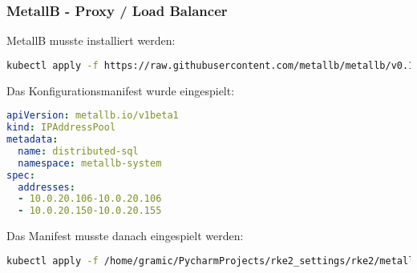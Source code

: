 \subsubsection{MetallB - Proxy / Load Balancer}
MetallB musste installiert werden:
\lstset{style=gra_codestyle}
\begin{lstlisting}[language=bash, caption=MetallB installieren,captionpos=b,label={lst:metallb-install},breaklines=true]
kubectl apply -f https://raw.githubusercontent.com/metallb/metallb/v0.14.4/config/manifests/metallb-native.yaml
\end{lstlisting}

Das Konfigurationsmanifest wurde eingespielt:
\lstset{style=gra_codestyle}
\begin{lstlisting}[language=yaml, caption=MetallB konfigurieren,captionpos=b,label={lst:metallb-config},breaklines=true]
apiVersion: metallb.io/v1beta1
kind: IPAddressPool
metadata:
  name: distributed-sql
  namespace: metallb-system
spec:
  addresses:
  - 10.0.20.106-10.0.20.106
  - 10.0.20.150-10.0.20.155
\end{lstlisting}

Das Manifest musste danach eingespielt werden:
\lstset{style=gra_codestyle}
\begin{lstlisting}[language=bash, caption=MetallB Konfiguration einspielen,captionpos=b,label={lst:metallb-apply},breaklines=true]
kubectl apply -f /home/gramic/PycharmProjects/rke2_settings/rke2/metallb-values.yaml
\end{lstlisting}

